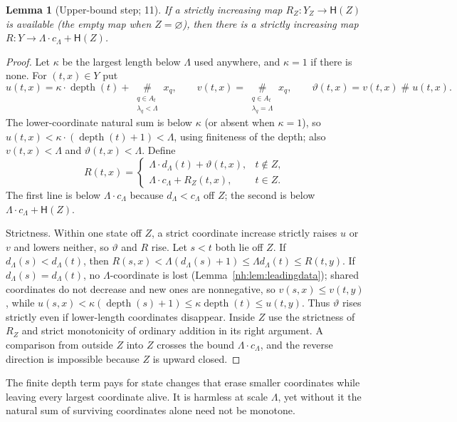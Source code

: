 \documentclass[11pt,a4paper]{article}
\newtheorem{lemma}[theorem]{Lemma}
\theoremstyle{definition}
\theoremstyle{remark}
\newcommand{\ns}{\mathbin{\#}}
\newcommand{\bigns}{\mathop{\#}\limits}
\newcommand{\HH}{\mathsf H}
\DeclareMathOperator{\depth}{depth}
\begin{document}
\begin{lemma}[Upper-bound step; 11]\label{nh:lem:upperstep}
If a strictly increasing map $R_Z:Y_Z\to\HH(Z)$ is available (the empty map
when $Z=\varnothing$), then there is a strictly increasing map
$R:Y\to\Lambda\cdot c_\Lambda+\HH(Z)$.
\end{lemma}
\begin{proof}
Let $\kappa$ be the largest length below $\Lambda$ used anywhere, and $\kappa=1$
if there is none. For $(t,x)\in Y$ put
\[
 u(t,x)=\kappa\cdot\depth(t)+\bigns_{\substack{q\in A_t\\ \lambda_q<\Lambda}}x_q,
 \qquad
 v(t,x)=\bigns_{\substack{q\in A_t\\ \lambda_q=\Lambda}}x_q,
 \qquad
 \vartheta(t,x)=v(t,x)\ns u(t,x).
\]
The lower-coordinate natural sum is below $\kappa$ (or absent when
$\kappa=1$), so $u(t,x)<\kappa\cdot(\depth(t)+1)<\Lambda$, using finiteness of
the depth; also $v(t,x)<\Lambda$ and $\vartheta(t,x)<\Lambda$. Define
\begin{equation}\label{nh:eq:peelR}
 R(t,x)=\begin{cases}
 \Lambda\cdot d_\Lambda(t)+\vartheta(t,x),&t\notin Z,\\
 \Lambda\cdot c_\Lambda+R_Z(t,x),&t\in Z.
 \end{cases}
\end{equation}
The first line is below $\Lambda\cdot c_\Lambda$ because $d_\Lambda<c_\Lambda$
off $Z$; the second is below $\Lambda\cdot c_\Lambda+\HH(Z)$.

Strictness. Within one state off $Z$, a strict coordinate increase strictly
raises $u$ or $v$ and lowers neither, so $\vartheta$ and $R$ rise. Let $s<t$ both
lie off $Z$. If $d_\Lambda(s)<d_\Lambda(t)$, then
$R(s,x)<\Lambda(d_\Lambda(s)+1)\le\Lambda d_\Lambda(t)\le R(t,y)$. If
$d_\Lambda(s)=d_\Lambda(t)$, no $\Lambda$-coordinate is lost
(Lemma~\ref{nh:lem:leadingdata}); shared coordinates do not decrease and new
ones are nonnegative, so $v(s,x)\le v(t,y)$, while
$u(s,x)<\kappa(\depth(s)+1)\le\kappa\depth(t)\le u(t,y)$. Thus $\vartheta$ rises
strictly even if lower-length coordinates disappear. Inside $Z$ use the
strictness of $R_Z$ and strict monotonicity of ordinary addition in its right
argument. A comparison from outside $Z$ into $Z$ crosses the bound
$\Lambda\cdot c_\Lambda$, and the reverse direction is impossible because $Z$
is upward closed.
\end{proof}

The finite depth term pays for state changes that erase smaller coordinates
while leaving every largest coordinate alive. It is harmless at scale $\Lambda$,
yet without it the natural sum of surviving coordinates alone need not be
monotone.
\end{document}

